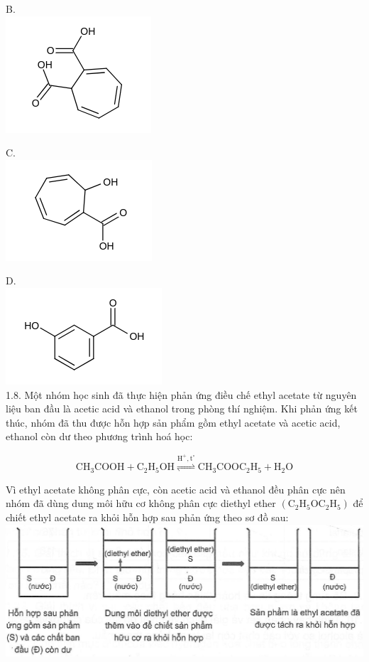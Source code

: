 \documentclass[10pt]{article}
\begin{document}
B.\\
\includegraphics{smile-0639e18d43051fab89dc474d5a4009662470e114}

C.\\
\includegraphics{smile-7657c68c5d8569f70a0806b76fe331c09a9f3f26}

D.\\
\includegraphics{smile-6abfa1662fb0693a3c2c343b6becface9723bbc8}\\
1.8. Một nhóm học sinh đã thực hiện phản ứng điều chế ethyl acetate từ nguyên liệu ban đầu là acetic acid và ethanol trong phòng thí nghiệm. Khi phản ứng kết thúc, nhóm đã thu được hỗn hợp sản phẩm gồm ethyl acetate và acetic acid, ethanol còn dư theo phương trình hoá học:

$$
\mathrm{CH}_{3} \mathrm{COOH}+\mathrm{C}_{2} \mathrm{H}_{5} \mathrm{OH} \stackrel{\mathrm{H}^{+}, \mathrm{t}^{\circ}}{\rightleftharpoons} \mathrm{CH}_{3} \mathrm{COOC}_{2} \mathrm{H}_{5}+\mathrm{H}_{2} \mathrm{O}
$$

Vì ethyl acetate không phân cực, còn acetic acid và ethanol đều phân cực nên nhóm đã dùng dung môi hữu cơ không phân cực diethyl ether $\left(\mathrm{C}_{2} \mathrm{H}_{5} \mathrm{OC}_{2} \mathrm{H}_{5}\right)$ để chiết ethyl acetate ra khỏi hỗn hợp sau phản ứng theo sơ đồ sau:\\
\includegraphics[max width=\textwidth, center]{2025_10_23_de6f5713836e4e91b3c8g-003}
\end{document}

